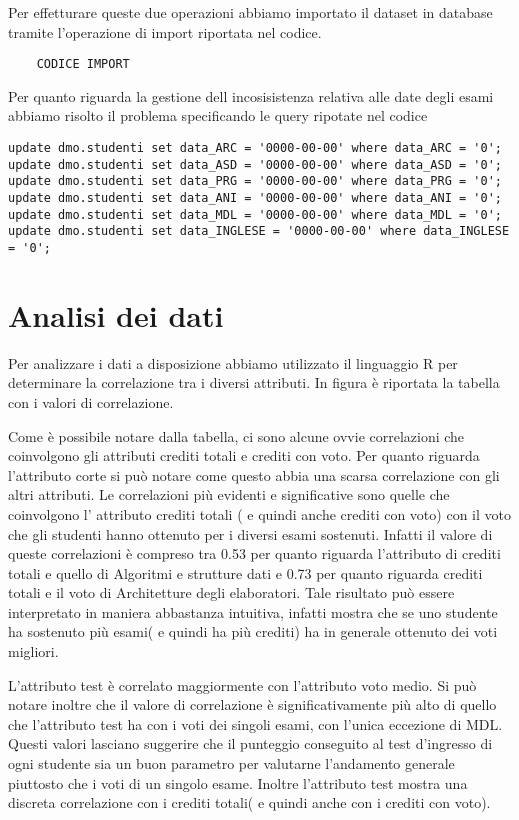 \documentclass[12pt]{article}
\begin{document}
Per effetturare queste due operazioni abbiamo importato il dataset in database tramite l'operazione di import riportata nel codice.
\begin{lstlisting}
	CODICE IMPORT
\end{lstlisting}
Per quanto riguarda la gestione dell incosisistenza relativa alle date degli esami abbiamo risolto il problema specificando le query ripotate nel codice
\begin{lstlisting}
update dmo.studenti set data_ARC = '0000-00-00' where data_ARC = '0'; 
update dmo.studenti set data_ASD = '0000-00-00' where data_ASD = '0'; 
update dmo.studenti set data_PRG = '0000-00-00' where data_PRG = '0'; 
update dmo.studenti set data_ANI = '0000-00-00' where data_ANI = '0'; 
update dmo.studenti set data_MDL = '0000-00-00' where data_MDL = '0';
update dmo.studenti set data_INGLESE = '0000-00-00' where data_INGLESE = '0';
\end{lstlisting}

\section{Analisi dei dati}
Per analizzare i dati a disposizione abbiamo utilizzato il linguaggio R per determinare la correlazione tra i diversi attributi.
In figura è riportata la tabella con i valori di correlazione.

Come è possibile notare dalla tabella, ci sono alcune ovvie correlazioni che coinvolgono gli attributi crediti totali e crediti con voto.
Per quanto riguarda l'attributo corte si può notare come questo abbia una scarsa correlazione con gli altri attributi.
Le correlazioni più evidenti e significative sono quelle che coinvolgono l' attributo crediti totali ( e quindi anche crediti con voto) con il voto che gli studenti hanno ottenuto per i diversi esami sostenuti.
Infatti il valore di queste correlazioni è compreso tra 0.53 per quanto riguarda l'attributo di crediti totali e quello di Algoritmi e strutture dati e 0.73 per quanto riguarda crediti totali e il voto di Architetture degli elaboratori.
Tale risultato può essere interpretato in maniera abbastanza intuitiva, infatti mostra che se uno studente ha sostenuto più esami( e quindi ha più crediti) ha in generale ottenuto dei voti migliori.

L'attributo test è correlato maggiormente con l'attributo voto medio. 
Si può notare inoltre che il valore di correlazione è significativamente più alto di quello che l'attributo test ha con i voti dei singoli esami, con l'unica eccezione di MDL.
Questi valori lasciano suggerire che il punteggio conseguito al test d'ingresso di ogni studente sia un buon parametro per valutarne l'andamento generale piuttosto che i voti di un singolo esame.
Inoltre l'attributo test mostra una discreta correlazione con i crediti totali( e quindi anche con i crediti con voto).
\end{document}
